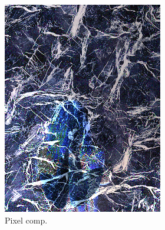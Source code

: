 \begin{figure}[]
\begin{subfigure}{\textwidth}
\begin{subfigure}{0.24\textwidth}
            \includegraphics[width=\textwidth]{images/04-experiment02/human/marble/pixel_im.jpg}
            \caption*{Pixel comp.}
        \end{subfigure}
        \hfill
        \begin{subfigure}{0.24\textwidth}
            \centering

\end{subfigure}
\end{subfigure}
\end{figure}
